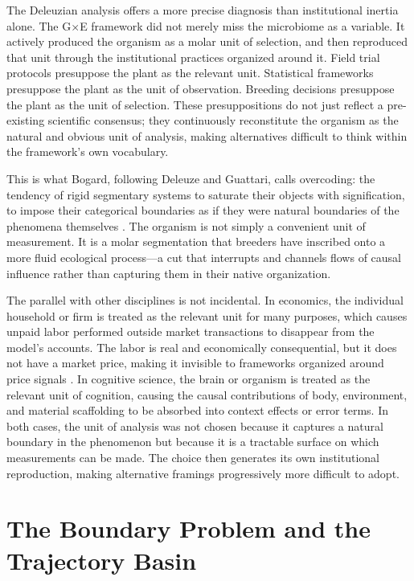 \documentclass[11pt, a4paper]{article}
\begin{document}
The Deleuzian analysis offers a more precise diagnosis than institutional inertia alone. The G$\times$E framework did not merely miss the microbiome as a variable. It actively produced the organism as a molar unit of selection, and then reproduced that unit through the institutional practices organized around it. Field trial protocols presuppose the plant as the relevant unit. Statistical frameworks presuppose the plant as the unit of observation. Breeding decisions presuppose the plant as the unit of selection. These presuppositions do not just reflect a pre-existing scientific consensus; they continuously reconstitute the organism as the natural and obvious unit of analysis, making alternatives difficult to think within the framework's own vocabulary.

This is what Bogard, following Deleuze and Guattari, calls overcoding: the tendency of rigid segmentary systems to saturate their objects with signification, to impose their categorical boundaries as if they were natural boundaries of the phenomena themselves \citep{bogard1998}. The organism is not simply a convenient unit of measurement. It is a molar segmentation that breeders have inscribed onto a more fluid ecological process---a cut that interrupts and channels flows of causal influence rather than capturing them in their native organization.

The parallel with other disciplines is not incidental. In economics, the individual household or firm is treated as the relevant unit for many purposes, which causes unpaid labor performed outside market transactions to disappear from the model's accounts. The labor is real and economically consequential, but it does not have a market price, making it invisible to frameworks organized around price signals \citep{Waring1988}. In cognitive science, the brain or organism is treated as the relevant unit of cognition, causing the causal contributions of body, environment, and material scaffolding to be absorbed into context effects or error terms. In both cases, the unit of analysis was not chosen because it captures a natural boundary in the phenomenon but because it is a tractable surface on which measurements can be made. The choice then generates its own institutional reproduction, making alternative framings progressively more difficult to adopt.

\section{The Boundary Problem and the Trajectory Basin}
\end{document}
